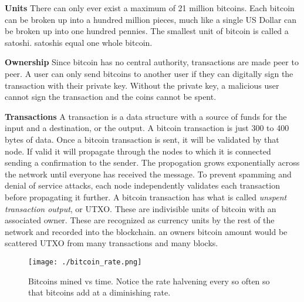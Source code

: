 \documentclass[conference]{IEEEtran}
\begin{document}
\textbf{Units} There can only ever exist a maximum of 21 million bitcoins. Each bitcoin can be broken up into a hundred million pieces, much like a single US Dollar can be broken up into one hundred pennies. The smallest unit of bitcoin is called a satoshi.  satoshis equal one whole bitcoin. \cite{units}

\textbf{Ownership} Since bitcoin has no central authority, transactions are made peer to peer. A user can only send bitcoins to another user if they can digitally sign the transaction with their private key. Without the private key, a malicious user cannot sign the transaction and the coins cannot be spent. \cite{ownership}

\textbf{Transactions} A transaction is a data structure with a source of funds for the input and a destination, or the output. A bitcoin transaction is just 300 to 400 bytes of data. Once a bitcoin transaction is sent, it will be validated by that node. If valid it will propagate through the nodes to which it is connected sending a confirmation to the sender. The propogation grows exponentially across the network until everyone has received the message. To prevent spamming and denial of service attacks, each node independently validates each transaction before propagating it further. A bitcoin transaction has what is called \textit{unspent transaction output}, or UTXO. These are indivisible units of bitcoin with an associated owner. These are recognized as currency units by the rest of the network and recorded into the blockchain. an owners bitcoin amount would be scattered UTXO from many transactions and many blocks. \cite{trans}

\begin{figure}[ht!]
\texttt{[image: ./bitcoin\_rate.png]} 
\caption{Bitcoins mined vs time. Notice the rate halvening every so often so that bitcoins add at a diminishing rate.}
\end{figure}
\end{document}
